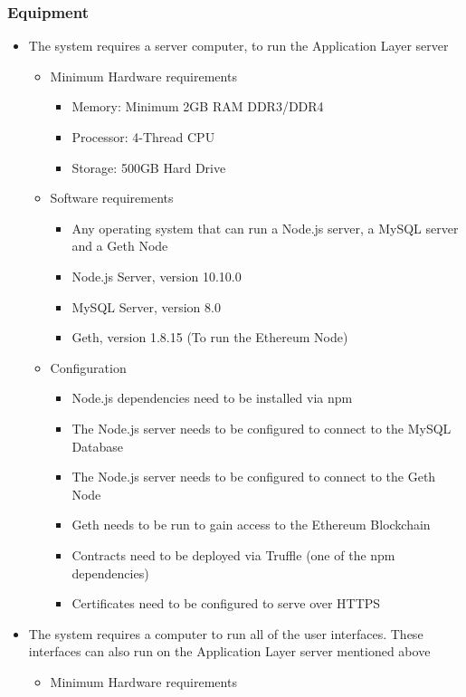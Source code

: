 \documentclass{article}
\begin{document}
\subsubsection*{Equipment}
\begin{itemize}
\item The system requires a server computer, to run the Application Layer server
\begin{itemize}
\item Minimum Hardware requirements
\begin{itemize}
\item Memory: Minimum 2GB RAM DDR3/DDR4
\item Processor: 4-Thread CPU
\item Storage: 500GB Hard Drive 
\end{itemize}
\item Software requirements
\begin{itemize}
\item Any operating system that can run a Node.js server, a MySQL server and a Geth Node
\item Node.js Server, version 10.10.0
\item MySQL Server, version 8.0
\item Geth, version 1.8.15 (To run the Ethereum Node)
\end{itemize}
\item Configuration
\begin{itemize}
\item Node.js dependencies need to be installed via npm
\item The Node.js server needs to be configured to connect to the MySQL Database
\item The Node.js server needs to be configured to connect to the Geth Node
\item Geth needs to be run to gain access to the Ethereum Blockchain
\item Contracts need to be deployed via Truffle (one of the npm dependencies)
\item Certificates need to be configured to serve over HTTPS
\end{itemize}
\end{itemize}
\item The system requires a computer to run all of the user interfaces. These interfaces can also run on the Application Layer server mentioned above
\begin{itemize}
\item Minimum Hardware requirements
\begin{itemize}

\end{itemize}
\end{itemize}
\end{itemize}
\end{document}
